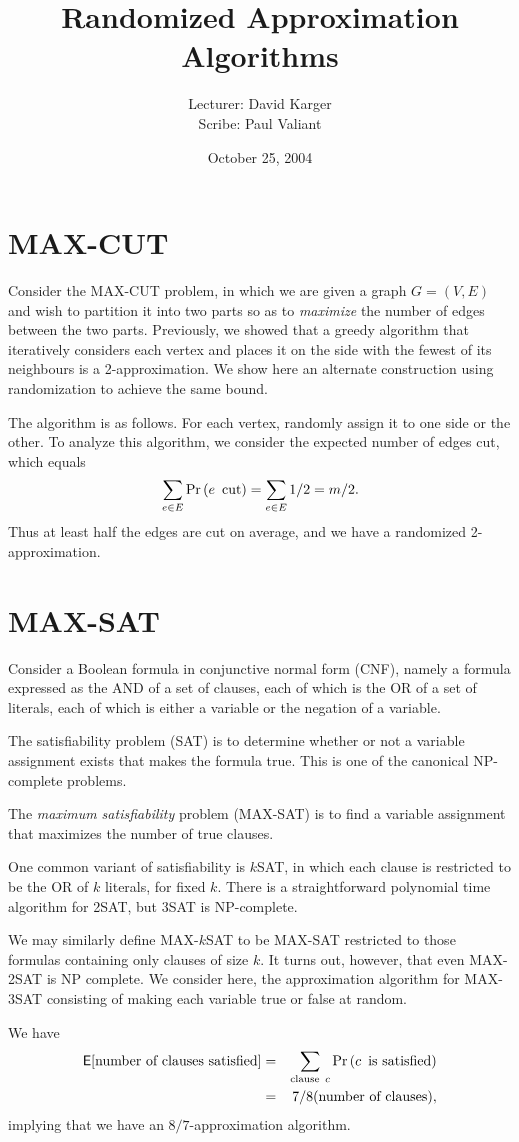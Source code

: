 \documentclass{article}
\title{Randomized Approximation Algorithms}
\date{October 25, 2004}
\author{Lecturer: David Karger\\ Scribe: Paul Valiant}
\renewcommand{\Pr}[1]{\textrm{\textup{Pr}}\left( #1 \right)}
\newcommand{\E}{\mbox{$\mathsf E$}}
\begin{document}
\section{MAX-CUT}

Consider the MAX-CUT problem, in which we are given a graph $G=(V,E)$ and wish to partition it into two parts so as to \emph{maximize} the number of edges between the two parts.  Previously, we showed that a greedy algorithm that iteratively considers each vertex and places it on the side with the fewest of its neighbours is a 2-approximation.  We show here an alternate construction using randomization to achieve the same bound.

The algorithm is as follows.  For each vertex, randomly assign it to one side or the other.  To analyze this algorithm, we consider the expected number of edges cut, which equals
$$\sum_{e\in E} \Pr{e \textrm{\enspace cut}}=\sum_{e\in E} 1/2=m/2.$$
Thus at least half the edges are cut on average, and we have a randomized 2-approximation.

\section{MAX-SAT}

Consider a Boolean formula in conjunctive normal form (CNF), namely a formula expressed as the AND of a set of clauses, each of which is the OR of a set of literals, each of which is either a variable or the negation of a variable.

The satisfiability problem (SAT) is to determine whether or not a variable assignment exists that makes the formula true.  This is one of the canonical NP-complete problems.

The \emph{maximum satisfiability} problem (MAX-SAT) is to find a variable assignment that maximizes the number of true clauses.

One common variant of satisfiability is $k$SAT, in which each clause is restricted to be the OR of $k$ literals, for fixed $k$.  There is a straightforward polynomial time algorithm for 2SAT, but 3SAT is NP-complete.

We may similarly define MAX-$k$SAT to be MAX-SAT restricted to those formulas containing only clauses of size $k$.  It turns out, however, that even MAX-2SAT is NP complete.  We consider here, the approximation algorithm for MAX-3SAT consisting of making each variable true or false at random.

We have 
\begin{align}
\E[\textrm{number of clauses satisfied}]&=&\sum_{\textrm{clause\enspace} c}\Pr{c\textrm{\enspace is satisfied}}\\
&=&7/8 (\textrm{number of clauses}),
\end{align}
implying that we have an $8/7$-approximation algorithm.
\end{document}
